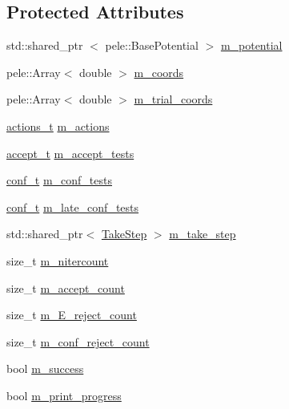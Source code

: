 \subsection*{\-Protected \-Attributes}
\begin{DoxyCompactItemize}
\item 
std\-::shared\-\_\-ptr\*
$<$ pele\-::\-Base\-Potential $>$ \hyperlink{classmcpele_1_1MC_a80e94b003bfc9893c1f829064125a81c}{m\-\_\-potential}
\item 
pele\-::\-Array$<$ double $>$ \hyperlink{classmcpele_1_1MC_a3a38fa108292b3e7270ad439ebb2c886}{m\-\_\-coords}
\item 
pele\-::\-Array$<$ double $>$ \hyperlink{classmcpele_1_1MC_ab32722238c16272bf95141b825fd3bf4}{m\-\_\-trial\-\_\-coords}
\item 
\hyperlink{classmcpele_1_1MC_a6b0a924bb76c28b6fc25c66675c1dcf9}{actions\-\_\-t} \hyperlink{classmcpele_1_1MC_a582e528bae7b630e6845628f49ae443d}{m\-\_\-actions}
\item 
\hyperlink{classmcpele_1_1MC_ab52ae82dba8e7299583f48a382f8bd5a}{accept\-\_\-t} \hyperlink{classmcpele_1_1MC_aa28a68b36566e4c5e4bb27ae816c37ab}{m\-\_\-accept\-\_\-tests}
\item 
\hyperlink{classmcpele_1_1MC_a025b387c3222c83625323afcddeda1ea}{conf\-\_\-t} \hyperlink{classmcpele_1_1MC_a444f1a159469de77761abced4a94dc48}{m\-\_\-conf\-\_\-tests}
\item 
\hyperlink{classmcpele_1_1MC_a025b387c3222c83625323afcddeda1ea}{conf\-\_\-t} \hyperlink{classmcpele_1_1MC_a6910233a8f6223c7826eebacb3f48f6c}{m\-\_\-late\-\_\-conf\-\_\-tests}
\item 
std\-::shared\-\_\-ptr$<$ \hyperlink{classmcpele_1_1TakeStep}{\-Take\-Step} $>$ \hyperlink{classmcpele_1_1MC_a3d1e08b4757ebbeab14b523b8cecbc54}{m\-\_\-take\-\_\-step}
\item 
size\-\_\-t \hyperlink{classmcpele_1_1MC_a1aac8aa817cf8eecd16eb414717b9205}{m\-\_\-nitercount}
\item 
size\-\_\-t \hyperlink{classmcpele_1_1MC_a44e3aeb2ee137f98ec748f589da34250}{m\-\_\-accept\-\_\-count}
\item 
size\-\_\-t \hyperlink{classmcpele_1_1MC_a98a00b35b659a559433c7f4bba313c34}{m\-\_\-\-E\-\_\-reject\-\_\-count}
\item 
size\-\_\-t \hyperlink{classmcpele_1_1MC_a47bd41b121d3fda1ed69281454edd8c9}{m\-\_\-conf\-\_\-reject\-\_\-count}
\item 
bool \hyperlink{classmcpele_1_1MC_ad31e9ad1eca13c1826461ceb915bad23}{m\-\_\-success}
\item 
bool \hyperlink{classmcpele_1_1MC_adca6168469b1bac463443a81ae8dde05}{m\-\_\-print\-\_\-progress}
\end{DoxyCompactItemize}


